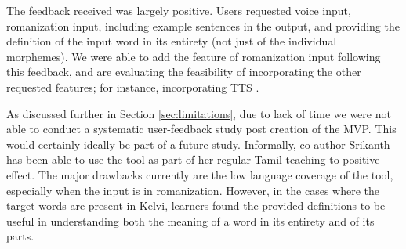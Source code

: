 \documentclass[11pt]{article}
\begin{document}
The feedback received was largely positive. Users requested voice input, 
romanization input, including example sentences in the output, and 
providing the definition of the input word in its entirety 
(not just of the individual morphemes). We were able to add the 
feature of romanization input following this feedback, and are 
evaluating the feasibility of incorporating the other requested features; for instance, incorporating TTS \citep{MAHAGANAPATHY2025100171}.

As discussed further in Section \ref{sec:limitations}, due to lack of time we were not able to conduct a systematic user-feedback study post creation of the MVP. This would certainly ideally be part of a future study. Informally, co-author Srikanth has been able to use the tool as part of her regular Tamil teaching to positive effect. The major drawbacks currently are the low language coverage of the tool, especially when the input is in romanization. However, in the cases where the target words are present in Kelvi, learners found the provided definitions to be useful in understanding both the meaning of a word in its entirety and of its parts.
\end{document}
